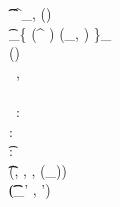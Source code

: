 \begin{figure}[h]
{{{%
\pcln\label{fuzzy:compute_meta} \t \t \cOutputMeta{\projIdx, \vecIdx} \assign  \genericSig[\blocklist]^{\genericRand_{\projIdx, \vecIdx}\primeRO(\clientVec[\projIdx, \vecIdx])} \bmod \rsaMod\\
\pcln\label{fuzzy:obfuscate_shares} \t \ssSet_\projIdx \assign \{ \ro(\qrGen^{\genericRand[\projIdx, \vecIdx]} \bmod \rsaMod) \oplus (\genericSymmKey_{\vecIdx}, \secretShare{\vecIdx}) \}_{\vecIdx \in \nats[\genericVecLen]} ~\quad{}\\
\pcln \cOutputFile \assign \encrypt[\genericSymmKey](\clientData) \\
\pcln {} ~\langle \genericContentID, \genericSymmKey \rangle \\
\hspace{2cm} \sendmessageright*[3cm]{\{\cOutputFile, \ssSet_{\projIdx}, \dhfSet_{\projIdx}, \cOutputMeta{\projIdx, \vecIdx}\}_{\projIdx \in \nats[\numProjections], \vecIdx \in \nats[\genericVecLen]}}\\
\hspace{2cm} \pcln {} ~\genericBlocklistElmt[\setIdx] \in \blocklist: \\
\hspace{2cm} \pcln \forall \projIdx \in \nats[\numProjections]: ~\quad {} \\
\hspace{2cm} \pcln \t \forall \vecIdx \in \nats[\genericVecLen]:\\
\hspace{2cm} \pcln \t \t \genericVec[\setIdx, \projIdx, \vecIdx] \assign \primeRO(\projFn[\projIdx], \blocklistVec[\setIdx, \vecIdx], \vecIdx, \projFn[\projIdx](\blocklistVec_{\setIdx})) \\
\hspace{2cm} \pcln\label{fuzzy:verifyRand} \t \t (\genericSymmKey_{\vecIdx}' , \secretShare{\vecIdx}')   \assign 
}}}
\end{figure}

